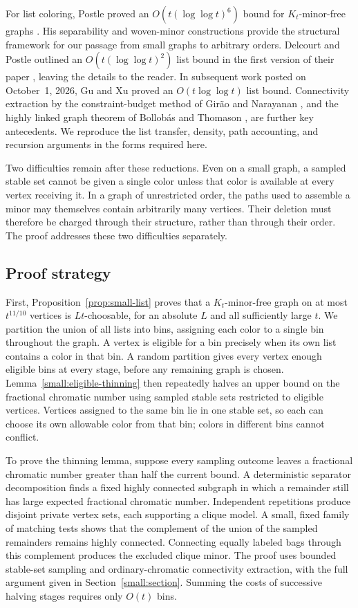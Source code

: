 For list coloring, Postle proved an $O(t(\log\log t)^6)$ bound for
$K_t$-minor-free graphs \cite[Theorem~1.8]{Postle2020}. His separability
and woven-minor constructions provide the structural framework for our
passage from small graphs to arbitrary orders. Delcourt and Postle outlined
an $O(t(\log\log t)^2)$ list bound in the first version of their paper
\cite[Section~6]{DelcourtPostle2021v1}, leaving the details to the reader.
In subsequent work posted on October~1, 2026, Gu and Xu
\cite[Theorem~1.3]{GuXu2026} proved an $O(t\log\log t)$ list bound.
Connectivity extraction by the constraint-budget method of Gir\~ao and Narayanan
\cite{GiraoNarayanan2022}, and the highly linked graph theorem of
Bollob\'as and Thomason \cite{BollobasThomason1996}, are further key
antecedents. We reproduce the list transfer, density, path accounting,
and recursion arguments in the forms required here.

Two difficulties remain after these reductions. Even on a small graph,
a sampled stable set cannot be given a single color unless that color is
available at every vertex receiving it. In a graph of unrestricted order,
the paths used to assemble a minor may themselves contain arbitrarily
many vertices. Their deletion must therefore be charged through their
structure, rather than through their order. The proof addresses these
two difficulties separately.

\subsection{Proof strategy}

First, Proposition~\ref{prop:small-list} proves that a $K_t$-minor-free
graph on at most $t^{11/10}$ vertices is $Lt$-choosable, for an absolute
$L$ and all sufficiently large $t$. We partition the union of all lists
into bins, assigning each color to a single bin throughout the graph.
A vertex is eligible for a bin precisely when its own list contains a
color in that bin. A random partition gives every vertex enough eligible
bins at every stage, before any remaining graph is chosen.
Lemma~\ref{small:eligible-thinning} then repeatedly halves an upper bound
on the fractional chromatic number using sampled stable sets restricted to eligible
vertices. Vertices assigned to the same bin lie in one stable set, so
each can choose its own allowable color from that bin; colors in different
bins cannot conflict.

To prove the thinning lemma, suppose every sampling outcome leaves a
fractional chromatic number greater than half the current bound. A deterministic separator
decomposition finds a fixed highly connected subgraph in which a
remainder still has large expected fractional chromatic number. Independent
repetitions produce disjoint private vertex sets, each supporting a clique
model. A small, fixed family of matching tests shows that the complement
of the union of the sampled remainders remains highly connected.
Connecting equally labeled bags through this complement produces the
excluded clique minor. The proof uses bounded stable-set sampling and
ordinary-chromatic connectivity extraction, with the full argument given
in Section~\ref{small:section}. Summing the costs of successive halving
stages requires only $O(t)$ bins.

